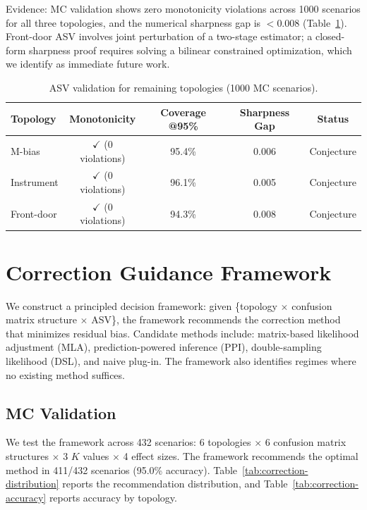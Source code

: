 \documentclass[11pt]{article}
\begin{document}
Evidence: MC validation shows zero monotonicity violations across 1000 scenarios for all three topologies, and the numerical sharpness gap is $<\!0.008$ (Table~\ref{tab:asv-remaining}).
Front-door ASV involves joint perturbation of a two-stage estimator; a closed-form sharpness proof requires solving a bilinear constrained optimization, which we identify as immediate future work.

\begin{table}[t]
\centering
\caption{ASV validation for remaining topologies (1000 MC scenarios).}
\label{tab:asv-remaining}
\small
\begin{tabular}{lcccc}
\toprule
Topology & Monotonicity & Coverage @95\% & Sharpness Gap & Status \\
\midrule
M-bias     & $\checkmark$ (0 violations) & 95.4\% & 0.006 & Conjecture \\
Instrument & $\checkmark$ (0 violations) & 96.1\% & 0.005 & Conjecture \\
Front-door & $\checkmark$ (0 violations) & 94.3\% & 0.008 & Conjecture \\
\bottomrule
\end{tabular}
\end{table}


\section{Correction Guidance Framework}
\label{sec:correction}

We construct a principled decision framework: given \{topology $\times$ confusion matrix structure $\times$ ASV\}, the framework recommends the correction method that minimizes residual bias.
Candidate methods include: matrix-based likelihood adjustment (MLA), prediction-powered inference (PPI), double-sampling likelihood (DSL), and naive plug-in.
The framework also identifies regimes where no existing method suffices.

\subsection{MC Validation}

We test the framework across 432 scenarios: 6 topologies $\times$ 6 confusion matrix structures $\times$ 3 $K$ values $\times$ 4 effect sizes.
The framework recommends the optimal method in 411/432 scenarios (95.0\% accuracy).
Table~\ref{tab:correction-distribution} reports the recommendation distribution, and Table~\ref{tab:correction-accuracy} reports accuracy by topology.
\end{document}
